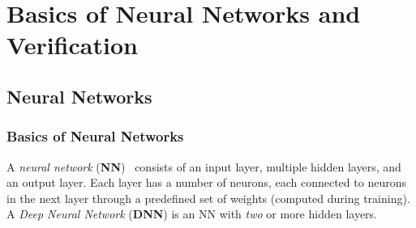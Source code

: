 \documentclass[oneside,11pt,dvipsnames]{book}
\numberwithin{equation}{section}
\theoremstyle{definition}
\theoremstyle{remark}
\begin{document}
\newcommand{\proofnet}[1]{
\begin{tikzpicture}[scale=#1,every node/.style={scale=#1},->,semithick]


  \node[input]  (x1) at (0,1) {$x_1$};
  \node[input]  (x2) at (0,-1) {$x_2$};

  \node[hidden] (v1) at (2.5,1) {$v_1$};
  \node[hidden] (v2) at (2.5,-1)   {$v_2$};
  \node[hidden] (v3) at (5,1) {$v_3$};
  \node[hidden] (v4) at (5,-1) {$v_4$};

  \node[output] (y1) at (7.5,1) {$y_1$};
  \node[output] (y2) at (7.5,-1) {$y_2$};

  \draw (x1) -- (v1) node[midway,above] {$-0.5$};


  \draw (x1) -- (v2) node[near end,below] {$0.3$};

  \draw (x2) -- (v2) node[midway,below] {$0.2$};
  \draw (x2) -- (v1) node[near end,above] {$0.2$};


  \draw (v1) -- (v3) node[midway,above] {$-0.9$};

  \draw (v1) -- (v4) node[near end,below] {$0.6$};


  \draw (v2) -- (v4) node[midway,below] {$0.9$};
  \draw (v2) -- (v3) node[near end,above] {$0.6$};

  \draw (v3) -- (y1) node[midway,above] {$-0.1$};
  \draw (v3) -- (y2) node[near end,below] {$-0.3$};
  \draw (v4) -- (y1) node[near end,above] {$0.2$};
  \draw (v4) -- (y2) node[midway,below] {$0.5$};

  \node[above] at (v1.north) {$-0.5$};
  \node[above] at (v3.north) {$0.2$};
  \node[above] at (y1.north) {$-0.4$};

  \node[below] at (v2.south) {$0.3$};
  \node[below] at (v4.south) {$-0.1$};
  \node[below] at (y2.south) {$-0.5$};

\end{tikzpicture}
}

\part{Basics of Neural Networks and Verification}
\chapter{Neural Networks}\label{chap:nn-basics}

\section{Basics of Neural Networks}
A \emph{neural network} (\textbf{NN})~\cite{Goodfellow-et-al-2016} consists of an input layer, multiple hidden layers, and an output layer. Each layer has a number of neurons, each connected to neurons in the next layer through a predefined set of weights (computed during training). A \emph{Deep Neural Network} (\textbf{DNN}) is an NN with \emph{two} or more hidden layers.
\end{document}
